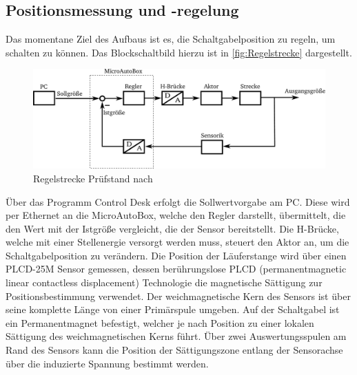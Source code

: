 \subsection {Positionsmessung und -regelung}\label{regler}

Das momentane Ziel des Aufbaus ist es, die Schaltgabelposition zu regeln, um schalten zu können. Das Blockschaltbild hierzu ist in \autoref{fig:Regelstrecke} dargestellt.
\begin{figure}[h]
	\centering
		\includegraphics[width=0.95\columnwidth]{Bilder/Schaltgabelregelung.pdf}
	\caption{Regelstrecke Prüfstand nach \cite{adp}}
	\label{fig:Regelstrecke}
\end{figure} \noindent
Über das Programm Control Desk erfolgt die Sollwertvorgabe am PC. Diese wird per Ethernet an die MicroAutoBox, welche den Regler darstellt, übermittelt, die den Wert mit der Istgröße vergleicht, die der Sensor bereitstellt. Die H-Brücke, welche mit einer Stellenergie versorgt werden muss, steuert den Aktor an, um die Schaltgabelposition zu verändern.
Die Position der Läuferstange wird über einen PLCD-25M Sensor gemessen, dessen berührungslose PLCD (permanentmagnetic linear contactless displacement) Technologie die magnetische Sättigung zur Positionsbestimmung verwendet. Der weichmagnetische Kern des Sensors ist über seine komplette Länge von einer Primärspule umgeben. Auf der Schaltgabel ist ein Permanentmagnet befestigt, welcher je nach Position zu einer lokalen Sättigung des weichmagnetischen Kerns führt. Über zwei Auswertungsspulen am Rand des Sensors kann die Position der Sättigungszone entlang der Sensorachse über die induzierte Spannung bestimmt werden.

